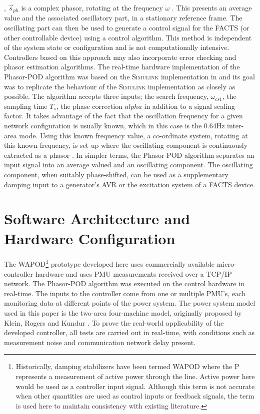 \documentclass{ieeeaccess}
\begin{document}
, $\stackrel{\to }{s}_{ph}$ is a complex phasor, rotating at the frequency $\omega$ \cite{PhasorPOD}. This presents an average value and the associated oscillatory part, in a stationary reference frame. The oscillating part can then be used to generate a control signal for the FACTS (or other controllable device) using a control algorithm. This method is independent of the system state or configuration and is not computationally intensive. Controllers based on this approach may also incorporate error checking and phasor estimation algorithms. The real-time hardware implementation of the Phasor-POD algorithm was based on the \textsc{Simulink} implementation in \cite{PhasorPODImplement} and its goal was to replicate the behaviour of the \textsc{Simulink} implementation as closely as possible. The algorithm accepts three inputs; the search frequency, $\omega_{cs1}$, the sampling time $T_{s}$, the phase correction $alpha$ in addition to a signal scaling factor. It takes advantage of the fact that the oscillation frequency for a given network configuration is usually known, which in this case is the 0.64Hz inter-area mode. Using this known frequency value, a  co-ordinate system, rotating at this known frequency, is set up where the oscillating component is continuously extracted as a phasor \cite{PhasorPOD}. In simpler terms, the Phasor-POD algorithm separates an input signal into an average valued and an oscillating component. The oscillating component, when suitably phase-shifted, can be used as a supplementary damping input to a generator's AVR or the excitation system of a FACTS device.

\section{Software Architecture and Hardware Configuration}\label{softhardware}

The WAPOD\footnote{Historically, damping stabilizers have been termed WAPOD where the P represents a measurement of active power through the line. Active power here would be used as a controller input signal. Although this term is not accurate when other quantities are used as control inputs or feedback signals, the term is used here to maintain consistency with existing literature.} prototype developed here uses commercially available micro-controller hardware and uses PMU measurements received over a TCP/IP network. The Phasor-POD algorithm \cite{PhasorPOD} was executed on the control hardware in real-time. The inputs to the controller come from one or multiple PMU's, each monitoring data at different points of the power system. The power system model used in this paper is the two-area four-machine model, originally proposed by Klein, Rogers and Kundur \cite{KundurTwoArea}. To prove the real-world applicability of the developed controller, all tests are carried out in real-time, with conditions such as measurement noise and communication network delay present.
\end{document}
